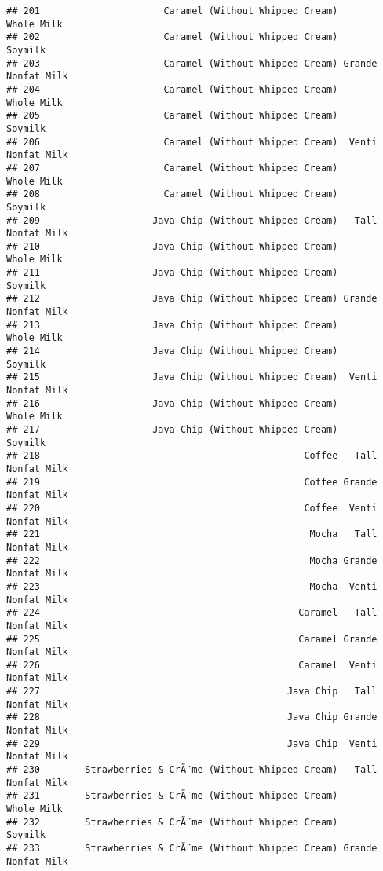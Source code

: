 \documentclass[
]{article}
\begin{document}
\begin{verbatim}
## 201                      Caramel (Without Whipped Cream)         Whole Milk
## 202                      Caramel (Without Whipped Cream)            Soymilk
## 203                      Caramel (Without Whipped Cream) Grande Nonfat Milk
## 204                      Caramel (Without Whipped Cream)         Whole Milk
## 205                      Caramel (Without Whipped Cream)            Soymilk
## 206                      Caramel (Without Whipped Cream)  Venti Nonfat Milk
## 207                      Caramel (Without Whipped Cream)         Whole Milk
## 208                      Caramel (Without Whipped Cream)            Soymilk
## 209                    Java Chip (Without Whipped Cream)   Tall Nonfat Milk
## 210                    Java Chip (Without Whipped Cream)         Whole Milk
## 211                    Java Chip (Without Whipped Cream)            Soymilk
## 212                    Java Chip (Without Whipped Cream) Grande Nonfat Milk
## 213                    Java Chip (Without Whipped Cream)         Whole Milk
## 214                    Java Chip (Without Whipped Cream)            Soymilk
## 215                    Java Chip (Without Whipped Cream)  Venti Nonfat Milk
## 216                    Java Chip (Without Whipped Cream)         Whole Milk
## 217                    Java Chip (Without Whipped Cream)            Soymilk
## 218                                               Coffee   Tall Nonfat Milk
## 219                                               Coffee Grande Nonfat Milk
## 220                                               Coffee  Venti Nonfat Milk
## 221                                                Mocha   Tall Nonfat Milk
## 222                                                Mocha Grande Nonfat Milk
## 223                                                Mocha  Venti Nonfat Milk
## 224                                              Caramel   Tall Nonfat Milk
## 225                                              Caramel Grande Nonfat Milk
## 226                                              Caramel  Venti Nonfat Milk
## 227                                            Java Chip   Tall Nonfat Milk
## 228                                            Java Chip Grande Nonfat Milk
## 229                                            Java Chip  Venti Nonfat Milk
## 230        Strawberries & CrÃ¨me (Without Whipped Cream)   Tall Nonfat Milk
## 231        Strawberries & CrÃ¨me (Without Whipped Cream)         Whole Milk
## 232        Strawberries & CrÃ¨me (Without Whipped Cream)            Soymilk
## 233        Strawberries & CrÃ¨me (Without Whipped Cream) Grande Nonfat Milk

\end{verbatim}
\end{document}

